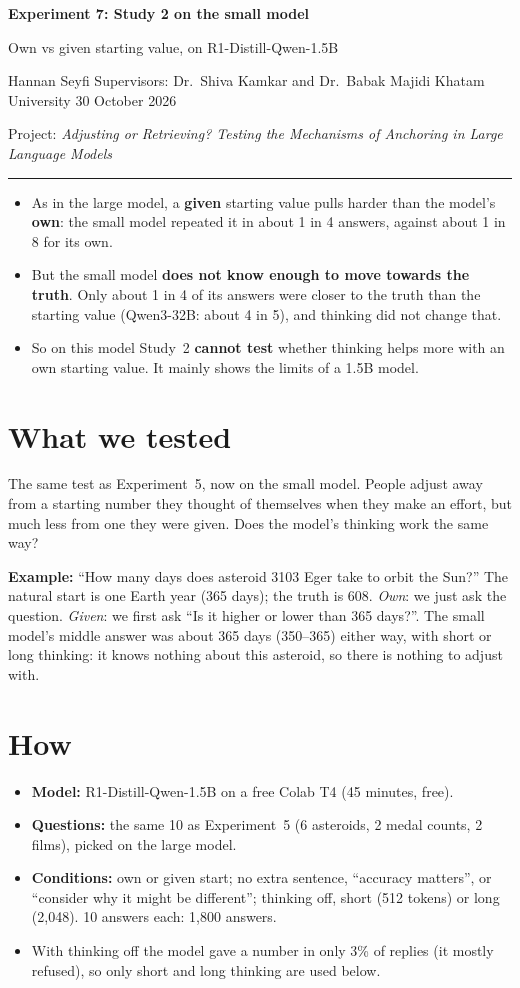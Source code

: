 \documentclass[11pt,a4paper]{article}
\newcommand{\inshort}[1]{\begin{tcolorbox}[colback=gray!6,colframe=gray!50,title=\textbf{In short},fonttitle=\normalsize]#1\end{tcolorbox}}
\newcommand{\header}[3]{%
  {\Large\textbf{#1}}\par\smallskip
  {\large #2}\par\smallskip
  {\small Hannan Seyfi \textperiodcentered{} Supervisors: Dr.\ Shiva Kamkar and Dr.\ Babak Majidi \textperiodcentered{} Khatam University \textperiodcentered{} #3}\par
  {\small Project: \emph{Adjusting or Retrieving? Testing the Mechanisms of Anchoring in Large Language Models}}\par\medskip\hrule\medskip}
\begin{document}
\header{Experiment 7: Study 2 on the small model}{Own vs given starting value, on R1-Distill-Qwen-1.5B}{30 October 2026}

\inshort{\begin{itemize}[leftmargin=*]
  \item As in the large model, a \textbf{given} starting value pulls harder than the model's \textbf{own}: the small model repeated it in about 1 in 4 answers, against about 1 in 8 for its own.
  \item But the small model \textbf{does not know enough to move towards the truth}. Only about 1 in 4 of its answers were closer to the truth than the starting value (Qwen3-32B: about 4 in 5), and thinking did not change that.
  \item So on this model Study~2 \textbf{cannot test} whether thinking helps more with an own starting value. It mainly shows the limits of a 1.5B model.
\end{itemize}}

\section*{What we tested}
The same test as Experiment~5, now on the small model. People adjust away from a starting number they thought of themselves when they make an effort, but much less from one they were given. Does the model's thinking work the same way?

\textbf{Example:} \enquote{How many days does asteroid 3103 Eger take to orbit the Sun?} The natural start is one Earth year (365 days); the truth is 608. \emph{Own}: we just ask the question. \emph{Given}: we first ask \enquote{Is it higher or lower than 365 days?}. The small model's middle answer was about 365 days (350--365) either way, with short or long thinking: it knows nothing about this asteroid, so there is nothing to adjust with.

\section*{How}
\begin{itemize}[leftmargin=*]
  \item \textbf{Model:} R1-Distill-Qwen-1.5B on a free Colab T4 (45 minutes, free).
  \item \textbf{Questions:} the same 10 as Experiment~5 (6 asteroids, 2 medal counts, 2 films), picked on the large model.
  \item \textbf{Conditions:} own or given start; no extra sentence, \enquote{accuracy matters}, or \enquote{consider why it might be different}; thinking off, short (512 tokens) or long (2,048). 10 answers each: 1,800 answers.
  \item With thinking off the model gave a number in only 3\% of replies (it mostly refused), so only short and long thinking are used below.
\end{itemize}
\end{document}
